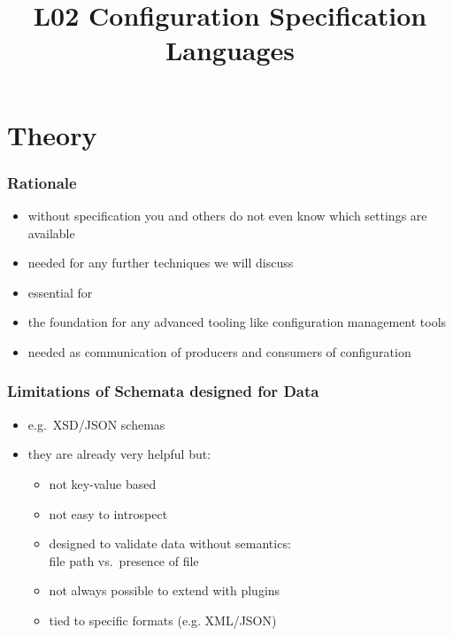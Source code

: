 

\title{L02 Configuration Specification Languages}



\section{Theory}

\begin{frame}
	\frametitle{Rationale}
	\begin{itemize}
	\item without specification you and others do not even know which settings are available
	\item needed for any further techniques we will discuss
	\pause
	\item essential for ~\citet{holland2001nofutz}
	\item the foundation for any advanced tooling like configuration management tools
	\pause
	\item needed as communication of producers and consumers of configuration
	\end{itemize}
\end{frame}

\begin{frame}
	\methodQuestion{}
\end{frame}

\begin{frame}
	\frametitle{Limitations of Schemata designed for Data}
	\begin{itemize}
	\item e.g.\ XSD/JSON schemas
	\item they are already very helpful but:
	\pause
	\begin{itemize}
	\item not key-value based
	\item not easy to introspect
	\item designed to validate data without semantics: \\ file path vs.\ presence of file
	\item not always possible to extend with plugins
	\item tied to specific formats (e.g. XML/JSON)
	\end{itemize}
	\end{itemize}
\end{frame}

